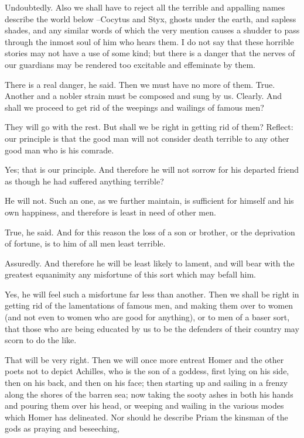 Undoubtedly.
Also we shall have to reject all the terrible and appalling names describe the world below --Cocytus and Styx, ghosts under the earth, and sapless shades, and any similar words of which the very mention causes a shudder to pass through the inmost soul of him who hears them. I do not say that these horrible stories may not have a use of some kind; but there is a danger that the nerves of our guardians may be rendered too excitable and effeminate by them.

There is a real danger, he said.
Then we must have no more of them.
True.
Another and a nobler strain must be composed and sung by us.
Clearly.
And shall we proceed to get rid of the weepings and wailings of famous men?

They will go with the rest.
But shall we be right in getting rid of them? Reflect: our principle is that the good man will not consider death terrible to any other good man who is his comrade.

Yes; that is our principle.
And therefore he will not sorrow for his departed friend as though he had suffered anything terrible?

He will not.
Such an one, as we further maintain, is sufficient for himself and his own happiness, and therefore is least in need of other men.

True, he said.
And for this reason the loss of a son or brother, or the deprivation of fortune, is to him of all men least terrible.

Assuredly.
And therefore he will be least likely to lament, and will bear with the greatest equanimity any misfortune of this sort which may befall him.

Yes, he will feel such a misfortune far less than another.
Then we shall be right in getting rid of the lamentations of famous men, and making them over to women (and not even to women who are good for anything), or to men of a baser sort, that those who are being educated by us to be the defenders of their country may scorn to do the like.

That will be very right.
Then we will once more entreat Homer and the other poets not to depict Achilles, who is the son of a goddess, first lying on his side, then on his back, and then on his face; then starting up and sailing in a frenzy along the shores of the barren sea; now taking the sooty ashes in both his hands and pouring them over his head, or weeping and wailing in the various modes which Homer has delineated. Nor should he describe Priam the kinsman of the gods as praying and beseeching,

